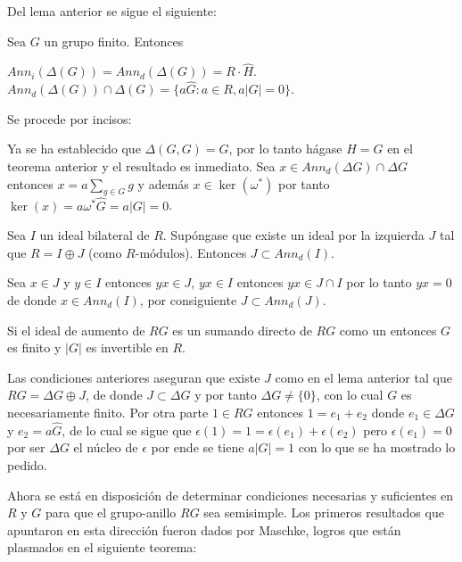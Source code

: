 Del lema anterior se sigue el siguiente:

\begin{corolario}
Sea $G$ un grupo finito. Entonces 

\begin{enumerate}
\newItem $Ann_i (\Delta(G)) = Ann_d(\Delta(G)) = R\cdot \hat{H}$.
\newItem $Ann_d(\Delta(G)) \cap \Delta (G) = \{ a\hat{G} : a \in R , a|G| = 0\}$.
\end{enumerate}
\end{corolario}


\begin{proof*}
Se procede por incisos:
\begin{bulletList}
\newItem Ya se ha establecido que $\Delta(G,G) = G$, por lo tanto hágase $H=G$ en el teorema anterior y el resultado es inmediato.
\newItem Sea $x \in Ann_d(\Delta G) \cap \Delta G$ entonces $x = a\sum_{g\in G}g$ y además $x \in \ker(\omega^*)$ por tanto $\ker(x)= a\omega^*\hat{G} = a|G| = 0 $. \qedhere
\end{bulletList}
\end{proof*}
\begin{lema}
Sea $I$ un ideal bilateral de $R$. Supóngase que existe un ideal por la izquierda $J$ tal que $R = I \oplus J$ (como $R\mbox{-módulos}$). Entonces $J \subset Ann_d(I) $.
\end{lema}
\begin{proof*}
Sea $x \in J$ y $y \in I $ entonces $yx \in J$, $yx \in I$ entonces $yx \in J\cap I$ por lo tanto $yx=0$ de donde $x \in Ann_d(I)$, por consiguiente $J \subset Ann_d(J)$. \qedhere 
\end{proof*}
\begin{lema}\label{aumento}
Si el ideal de aumento de $RG$ es un sumando directo de $RG$ como un  entonces $G$ es finito y $|G|$ es invertible en $R$.
\end{lema}
\begin{proof*}
Las condiciones anteriores aseguran que existe $J$ como en el lema anterior tal que $RG = \Delta G \oplus J$, de donde $J \subset \Delta G$  y por tanto $\Delta G \neq \{ 0 \}$, con lo cual $G$ es necesariamente finito.
Por otra parte $1 \in RG$ entonces $1 = e_1 + e_2$ donde $e_1 \in \Delta G$ y $e_2=a\hat{G}$, de lo cual se sigue que $\epsilon(1) = 1 = \epsilon(e_1) + \epsilon(e_2)$ pero $\epsilon(e_1) = 0$ por ser $\Delta G$ el núcleo de $\epsilon$ por ende se tiene $a|G| = 1$ con lo que se ha mostrado lo pedido. \qedhere
\end{proof*}
Ahora se está en disposición de determinar condiciones necesarias y suficientes en $R$ y $G$ para que el grupo-anillo $RG$ sea semisimple. Los primeros resultados que apuntaron en esta dirección fueron dados por Maschke, logros que están plasmados en el siguiente teorema:

